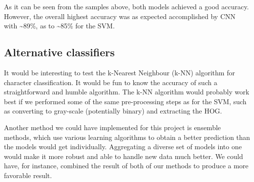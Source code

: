 As it can be seen from the samples above, both models achieved a good accuracy. However, the overall highest accuracy was as expected accomplished by CNN with \textasciitilde 89\%, as to \textasciitilde 85\% for the SVM.

\subsection{Alternative classifiers}

It would be interesting to test the k-Nearest Neighbour (k-NN) algorithm for character classification. It would be fun to know the accuracy of such a straightforward and humble algorithm. The k-NN algorithm would probably work best if we performed some of the same pre-processing steps as for the SVM, such as converting to gray-scale (potentially binary) and extracting the HOG.

Another method we could have implemented for this project is ensemble methods, which use various learning algorithms to obtain a better prediction than the models would get individually. Aggregating a diverse set of models into one would make it more robust and able to handle new data much better. We could have, for instance, combined the result of both of our methods to produce a more favorable result. 




